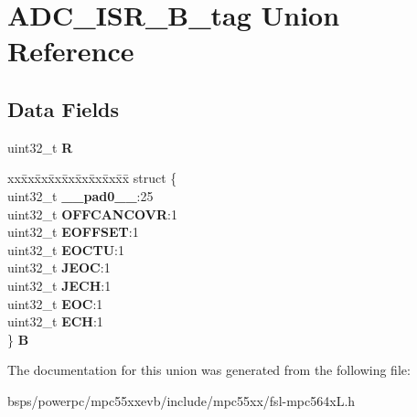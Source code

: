 \hypertarget{unionADC__ISR__32B__tag}{}\section{A\+D\+C\+\_\+\+I\+S\+R\+\_\+B\+\_\+tag Union Reference}
\label{unionADC__ISR__32B__tag}
\subsection*{Data Fields}
\begin{DoxyCompactItemize}
\item 
\mbox{\label{unionADC__ISR__32B__tag_abc516ae36d418bd59dc8527ede119ad4}} 
uint32\+\_\+t {\bfseries R}
\item 
\mbox{\label{unionADC__ISR__32B__tag_a8436d6611eb973d80a8166ee0e385547}} 
\begin{tabbing}
xx\=xx\=xx\=xx\=xx\=xx\=xx\=xx\=xx\=\kill
struct \{\\
\>uint32\_t {\bfseries \_\_pad0\_\_}:25\\
\>uint32\_t {\bfseries OFFCANCOVR}:1\\
\>uint32\_t {\bfseries EOFFSET}:1\\
\>uint32\_t {\bfseries EOCTU}:1\\
\>uint32\_t {\bfseries JEOC}:1\\
\>uint32\_t {\bfseries JECH}:1\\
\>uint32\_t {\bfseries EOC}:1\\
\>uint32\_t {\bfseries ECH}:1\\
\} {\bfseries B}\\

\end{tabbing}\end{DoxyCompactItemize}


The documentation for this union was generated from the following file\+:\begin{DoxyCompactItemize}
\item 
bsps/powerpc/mpc55xxevb/include/mpc55xx/fsl-\/mpc564x\+L.\+h\end{DoxyCompactItemize}
